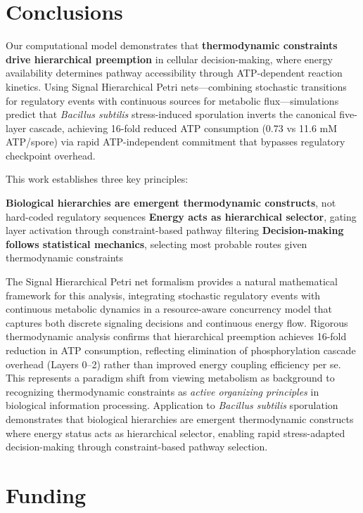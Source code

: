 \documentclass[twocolumn,11pt]{article}
\begin{document}
\section{Conclusions}

Our computational model demonstrates that \textbf{thermodynamic constraints drive hierarchical preemption} in cellular decision-making, where energy availability determines pathway accessibility through ATP-dependent reaction kinetics. Using Signal Hierarchical Petri nets—combining stochastic transitions for regulatory events with continuous sources for metabolic flux—simulations predict that \textit{Bacillus subtilis} stress-induced sporulation inverts the canonical five-layer cascade, achieving 16-fold reduced ATP consumption (0.73 vs 11.6 mM ATP/spore) via rapid ATP-independent commitment that bypasses regulatory checkpoint overhead.

This work establishes three key principles:

\textbf{Biological hierarchies are emergent thermodynamic constructs}, not hard-coded regulatory sequences
\textbf{Energy acts as hierarchical selector}, gating layer activation through constraint-based pathway filtering
\textbf{Decision-making follows statistical mechanics}, selecting most probable routes given thermodynamic constraints


The Signal Hierarchical Petri net formalism provides a natural mathematical framework for this analysis, integrating stochastic regulatory events with continuous metabolic dynamics in a resource-aware concurrency model that captures both discrete signaling decisions and continuous energy flow. Rigorous thermodynamic analysis confirms that hierarchical preemption achieves 16-fold reduction in ATP consumption, reflecting elimination of phosphorylation cascade overhead (Layers 0--2) rather than improved energy coupling efficiency per se. This represents a paradigm shift from viewing metabolism as background to recognizing thermodynamic constraints as \textit{active organizing principles} in biological information processing. Application to \textit{Bacillus subtilis} sporulation demonstrates that biological hierarchies are emergent thermodynamic constructs where energy status acts as hierarchical selector, enabling rapid stress-adapted decision-making through constraint-based pathway selection.

\section*{Funding}
\end{document}
